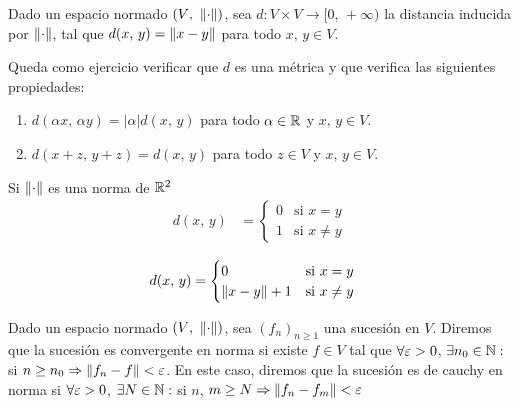 Dado un espacio normado \((V \text{, } \left\lVert\cdot\right\rVert)\), sea \(d : V \times V \to [0\text{, } +\infty)\) la distancia inducida por
\(\left\lVert\cdot\right\rVert\), tal que \(d(x\text{, }y) = \left\lVert x - y\right\rVert\) para todo \(x\text{, }y \in V\).

Queda como ejercicio verificar que \(d\) es una métrica y que verifica las siguientes propiedades: \begin{enumerate}
    \item \(d(\alpha x\text{, } \alpha y) = |\alpha| d(x\text{, }y)\) para todo \(\alpha \in \mathbb{R}\) y \(x\text{, }y \in V\).
    \item \(d(x + z \text{, } y + z) = d(x \text{, }y)\) para todo \(z \in V\) y \(x\text{, }y \in V\).
\end{enumerate}

\begin{eg}
    Si \(\left\lVert\cdot\right\rVert\) es una norma de \(\mathbb{R}^2\)
    \begin{align*}
        d(x\text{, }y) & = \begin{cases}
                               0 & \text{si } x = y    \\
                               1 & \text{si } x \neq y
                           \end{cases} \\
    \end{align*}
    \begin{align*}
        d(x\text{, }y) & = \begin{cases}
                               0                & \text{si } x = y    \\
                               \left\lVert x - y\right\rVert + 1 & \text{si } x \neq y
                           \end{cases}
    \end{align*}
\end{eg}

\begin{definition}
    Dado un espacio normado \((V \text{, } \left\lVert\cdot\right\rVert)\), sea \((f_n)_{n \geq 1}\)
    una sucesión en \(V\). Diremos que la sucesión es convergente en norma si existe \(f \in V\) tal que
    \(\forall \varepsilon > 0\), \(\exists n_0 \in \mathbb{N} :\) si \(n \geq n_0 \Rightarrow \left\lVert f_n - f\right\rVert < \varepsilon\).
    En este caso, diremos que la sucesión es de cauchy en norma si \(\forall \varepsilon > 0\), \(\exists N \in \mathbb{N} : \) si \(n\), \(m \geq N \Rightarrow \left\lVert f_n - f_m\right\rVert < \varepsilon\)
\end{definition}

